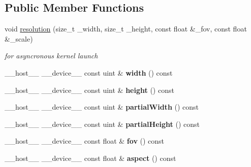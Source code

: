 \subsection*{Public Member Functions}
\begin{DoxyCompactItemize}
\item 
void \hyperlink{struct_camera_ab0cbf1b102afdeb285ef2be271d1701c}{resolution} (size\+\_\+t \+\_\+width, size\+\_\+t \+\_\+height, const float \&\+\_\+fov, const float \&\+\_\+scale)\hypertarget{struct_camera_ab0cbf1b102afdeb285ef2be271d1701c}{}\label{struct_camera_ab0cbf1b102afdeb285ef2be271d1701c}

\begin{DoxyCompactList}\small\item\em for asyncronous kernel launch \end{DoxyCompactList}\item 
\+\_\+\+\_\+host\+\_\+\+\_\+ \+\_\+\+\_\+device\+\_\+\+\_\+ const uint \& {\bfseries width} () const\hypertarget{struct_camera_ab39e2f75274888801cca29d02f1674dd}{}\label{struct_camera_ab39e2f75274888801cca29d02f1674dd}

\item 
\+\_\+\+\_\+host\+\_\+\+\_\+ \+\_\+\+\_\+device\+\_\+\+\_\+ const uint \& {\bfseries height} () const\hypertarget{struct_camera_ab278efa15a6f64374e5d82684a75ddc4}{}\label{struct_camera_ab278efa15a6f64374e5d82684a75ddc4}

\item 
\+\_\+\+\_\+host\+\_\+\+\_\+ \+\_\+\+\_\+device\+\_\+\+\_\+ const uint \& {\bfseries partial\+Width} () const\hypertarget{struct_camera_a915024fbf05e7df1851d888395b3dad8}{}\label{struct_camera_a915024fbf05e7df1851d888395b3dad8}

\item 
\+\_\+\+\_\+host\+\_\+\+\_\+ \+\_\+\+\_\+device\+\_\+\+\_\+ const uint \& {\bfseries partial\+Height} () const\hypertarget{struct_camera_aa44087070fe5ddf954a765fef12705fa}{}\label{struct_camera_aa44087070fe5ddf954a765fef12705fa}

\item 
\+\_\+\+\_\+host\+\_\+\+\_\+ \+\_\+\+\_\+device\+\_\+\+\_\+ const float \& {\bfseries fov} () const\hypertarget{struct_camera_a048b58c104109d4a991d149ca13d28d2}{}\label{struct_camera_a048b58c104109d4a991d149ca13d28d2}

\item 
\+\_\+\+\_\+host\+\_\+\+\_\+ \+\_\+\+\_\+device\+\_\+\+\_\+ const float \& {\bfseries aspect} () const\hypertarget{struct_camera_a2a46a204df35e1f59b314cfcd7a86131}{}\label{struct_camera_a2a46a204df35e1f59b314cfcd7a86131}


\end{DoxyCompactItemize}
